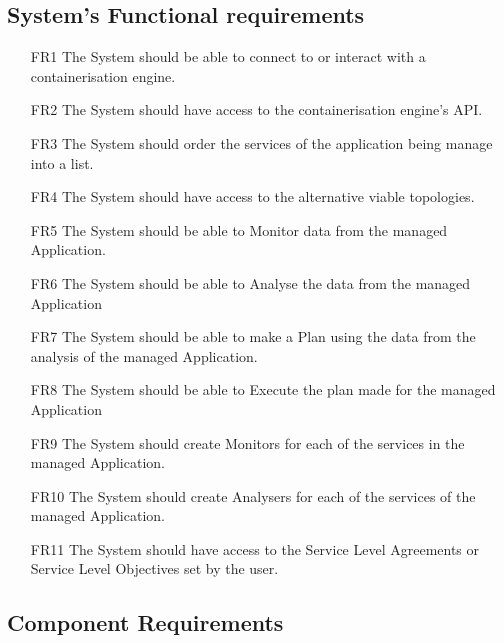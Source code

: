 \subsection{{System's Functional requirements}}
\begin{itemize}
    \item [FR1] The System should be able to connect to or interact with a containerisation engine.
    \item [FR2] The System should have access to the containerisation engine's API.
    \item [FR3] The System should order the services of the application being manage into a list.
    \item [FR4] The System should have access to the alternative viable topologies.
    \item [FR5] The System should be able to Monitor data from the managed Application.
     \item [FR6] The System should be able to Analyse the data from the managed Application
     \item [FR7] The System should be able to make a Plan using the data from the analysis of the managed Application.
     \item [FR8] The System should be able to Execute the plan made for the managed Application
    \item [FR9] The System should create Monitors for each of the services in the managed Application.
    \item [FR10] The System should create Analysers for each of the services of the managed Application.
     \item [FR11] The System should have access to the Service Level Agreements or Service Level Objectives set by the user.
\end{itemize}

\subsection{Component Requirements}

